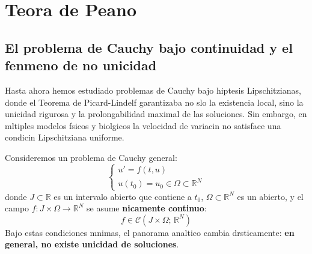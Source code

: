 
\section{Teora de Peano}

\subsection{El problema de Cauchy bajo continuidad y el fenmeno de no unicidad}

Hasta ahora hemos estudiado problemas de Cauchy bajo hiptesis Lipschitzianas, donde el Teorema de Picard-Lindelf garantizaba no slo la existencia local, sino la unicidad rigurosa y la prolongabilidad maximal de las soluciones. Sin embargo, en mltiples modelos fsicos y biolgicos la velocidad de variacin no satisface una condicin Lipschitziana uniforme.

Consideremos un problema de Cauchy general:
\[
    \begin{cases}
        u' = f(t, u) \\
        u(t_0) = u_0 \in \Omega \subset \mathbb{R}^N
    \end{cases}
\]
donde $J \subset \mathbb{R}$ es un intervalo abierto que contiene a $t_0$, $\Omega \subset \mathbb{R}^N$ es un abierto, y el campo $f: J \times \Omega \to \mathbb{R}^N$ se asume \textbf{nicamente continuo}:
\[
    f \in \mathcal{C}(J \times \Omega; \, \mathbb{R}^N)
\]
Bajo estas condiciones mnimas, el panorama analtico cambia drsticamente: \textbf{en general, no existe unicidad de soluciones}.

